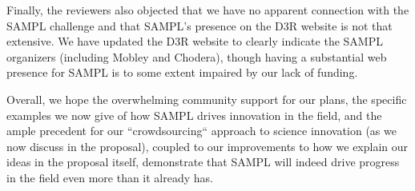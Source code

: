 \documentclass[11pt]{article}
\begin{document}
Finally, the reviewers also objected that we have no apparent connection with the SAMPL challenge and that SAMPL's presence on the D3R website is not that extensive. 
We have updated the D3R website to clearly indicate the SAMPL organizers (including Mobley and Chodera), though having a substantial web presence for SAMPL is to some extent impaired by our lack of funding. 

Overall, we hope the overwhelming community support for our plans, the specific examples we now give of how SAMPL drives innovation in the field, and the ample precedent for our ``crowdsourcing`` approach to science innovation (as we now discuss in the proposal), coupled to our improvements to how we explain our ideas in the proposal itself, demonstrate that SAMPL will indeed drive progress in the field even more than it already has. 



\end{document}
